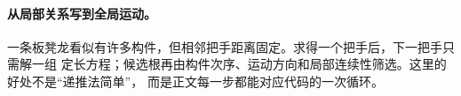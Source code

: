 \paragraph{从局部关系写到全局运动。}
一条板凳龙看似有许多构件，但相邻把手距离固定。求得一个把手后，下一把手只需解一组
定长方程；候选根再由构件次序、运动方向和局部连续性筛选。这里的好处不是“递推法简单”，
而是正文每一步都能对应代码的一次循环。

